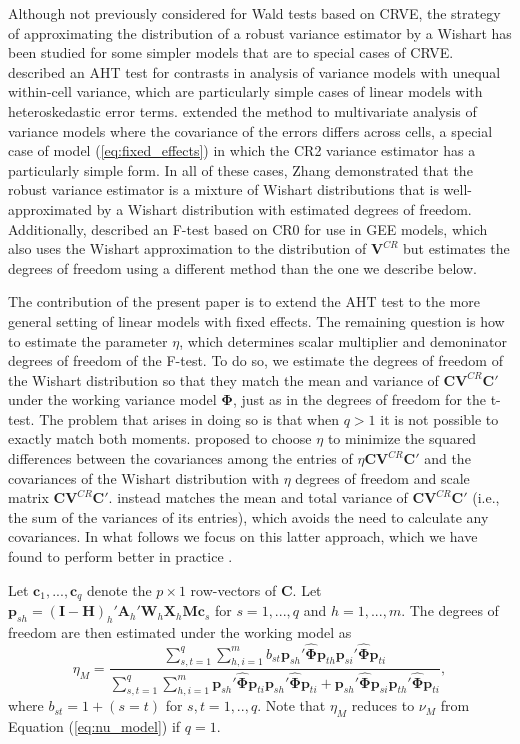 \documentclass[12pt]{article}
\newcommand{\bm}{\mathbf}
\newcommand{\bs}{\boldsymbol}
\begin{document}
Although not previously considered for Wald tests based on CRVE, the strategy of approximating the distribution of a robust variance estimator by a Wishart has been studied for some simpler models that are to special cases of CRVE. \citet{Zhang2013tests, Zhang2012twowayANOVA} described an AHT test for contrasts in analysis of variance models with unequal within-cell variance, which are particularly simple cases of linear models with heteroskedastic error terms. \citet{Zhang2012MANOVA} extended the method to multivariate analysis of variance models where the covariance of the errors differs across cells, a special case of model (\ref{eq:fixed_effects}) in which the CR2 variance estimator has a particularly simple form. In all of these cases, Zhang demonstrated that the robust variance estimator is a mixture of Wishart distributions that is well-approximated by a Wishart distribution with estimated degrees of freedom. Additionally, \citet{Pan2002small} described an F-test based on CR0 for use in GEE models, which also uses the Wishart approximation to the distribution of $\bm{V}^{CR}$ but estimates the degrees of freedom using a different method than the one we describe below.

The contribution of the present paper is to extend the AHT test to the more general setting of linear models with fixed effects. The remaining question is how to estimate the parameter $\eta$, which determines scalar multiplier and demoninator degrees of freedom of the F-test. 
To do so, we estimate the degrees of freedom of the Wishart distribution so that they match the mean and variance of $\bm{C}\bm{V}^{CR} \bm{C}'$ under the working variance model $\bs\Phi$, just as in the degrees of freedom for the t-test. 
The problem that arises in doing so is that when $q > 1$ it is not possible to exactly match both moments. 
\cite{Pan2002small} proposed to choose $\eta$ to minimize the squared differences between the covariances among the entries of $\eta \bm{C}\bm{V}^{CR}\bm{C}'$ and the covariances of the Wishart distribution with $\eta$ degrees of freedom and scale matrix $\bm{C}\bm{V}^{CR}\bm{C}'$. \citet{Zhang2012MANOVA} instead matches the mean and total variance of $\bm{C}\bm{V}^{CR}\bm{C}'$ (i.e., the sum of the variances of its entries), which avoids the need to calculate any covariances. In what follows we focus on this latter approach, which we have found to perform better in practice \citep{Tipton2015small}.

Let $\bm{c}_1,...,\bm{c}_q$ denote the $p \times 1$ row-vectors of $\bm{C}$. 
Let $\bm{p}_{sh} = \left(\bm{I} - \bm{H}\right)_h'\bm{A}_h'\bm{W}_h\bm{X}_h\bm{M}\bm{c}_s$ for $s = 1,...,q$ and $h = 1,...,m$. 
The degrees of freedom are then estimated under the working model as
\begin{equation}
\label{eq:eta_model}
\eta_M = \frac{\sum_{s,t=1}^q \sum_{h,i=1}^m b_{st} \bm{p}_{sh}'\hat{\bs\Phi}\bm{p}_{th} \bm{p}_{si}'\hat{\bs\Phi}\bm{p}_{ti}}{\sum_{s,t=1}^q \sum_{h,i=1}^m \bm{p}_{sh}'\hat{\bs\Phi}\bm{p}_{ti} \bm{p}_{sh}'\hat{\bs\Phi}\bm{p}_{ti} + \bm{p}_{sh}'\hat{\bs\Phi}\bm{p}_{si} \bm{p}_{th}'\hat{\bs\Phi}\bm{p}_{ti}},
\end{equation}
where $b_{st} = 1 + (s=t)$ for $s,t=1,..,q$.
Note that $\eta_M$ reduces to $\nu_M$ from Equation (\ref{eq:nu_model}) if $q = 1$.
\end{document}
